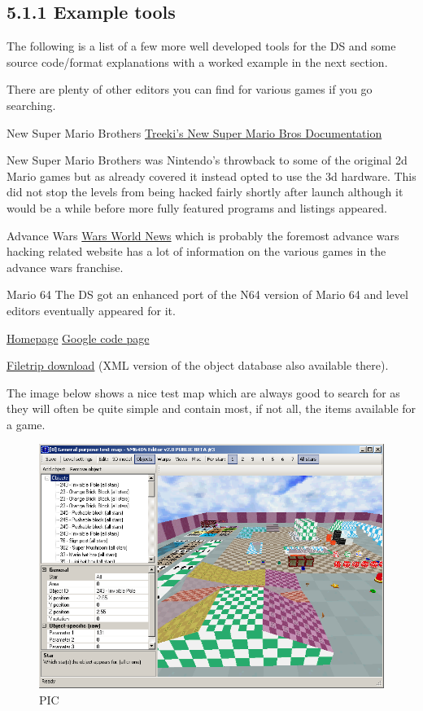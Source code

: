 \documentclass[
]{book}
\begin{document}
\hypertarget{example-tools}{%
\subsection{5.1.1 Example tools}\label{example-tools}}

The following is a list of a few more well developed tools for the DS and some source code/format explanations with a worked example in the next section.

There are plenty of other editors you can find for various games if you go searching.

New Super Mario Brothers \href{http://treeki.rustedlogic.net/romhacking/docs.html}{Treeki's New Super Mario Bros Documentation}

New Super Mario Brothers was Nintendo's throwback to some of the original 2d Mario games but as already covered it instead opted to use the 3d hardware. This did not stop the levels from being hacked fairly shortly after launch although it would be a while before more fully featured programs and listings appeared.

Advance Wars \href{http://www.warsworldnews.com/index.php?page=mapsindex.html}{Wars World News} which is probably the foremost advance wars hacking related website has a lot of information on the various games in the advance wars franchise.

Mario 64 The DS got an enhanced port of the N64 version of Mario 64 and level editors eventually appeared for it.

\href{http://kuribo64.cjb.net/downloads.php}{Homepage} \href{http://sm64dse.googlecode.com/svn/trunk/}{Google code page}

\href{http://filetrip.net/nds-downloads/rom-hacks/download-sm64ds-editor-mario-64-ds-20-beta-3-f29354.html}{Filetrip download} (XML version of the object database also available there).

The image below shows a nice test map which are always good to search for as they will often be quite simple and contain most, if not all, the items available for a game.

\begin{figure}
\centering
\includegraphics{images/167_home_fast6191_romhackingguide_unrenamed_fil___nal_borders_romhackguideleveleditingMario64.png}
\caption{PIC}
\end{figure}
\end{document}
